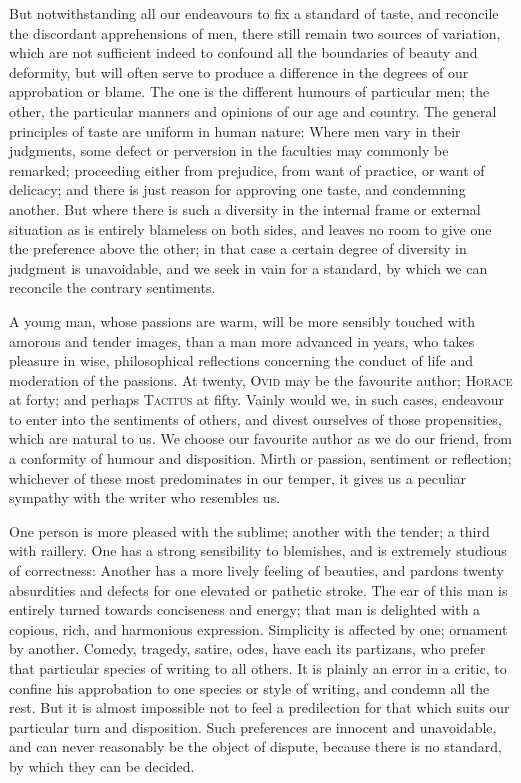 But notwithstanding all our endeavours to fix a standard of taste, and
reconcile the discordant apprehensions of men, there still remain two
sources of variation, which are not sufficient indeed to confound all
the boundaries of beauty and deformity, but will often serve to
produce a difference in the degrees of our approbation or blame. The
one is the different humours of particular men; the other, the
particular manners and opinions of our age and country. The general
principles of taste are uniform in human nature: Where men vary in
their judgments, some defect or perversion in the faculties may
commonly be remarked; proceeding either from prejudice, from want of
practice, or want of delicacy; and there is just reason for approving
one taste, and condemning another. But where there is such a diversity
in the internal frame or external situation as is entirely blameless
on both sides, and leaves no room to give one the preference above the
other; in that case a certain degree of diversity in judgment is
unavoidable, and we seek in vain  for a standard, by which
we can reconcile the contrary sentiments.

A young man, whose passions are warm, will be more sensibly touched
with amorous and tender images, than a man more advanced in years, who
takes pleasure in wise, philosophical reflections concerning the
conduct of life and moderation of the passions. At twenty,
\textsc{Ovid} may be the favourite author; \textsc{Horace} at forty;
and perhaps \textsc{Tacitus} at fifty. Vainly would we, in such cases,
endeavour to enter into the sentiments of others, and divest ourselves
of those propensities, which are natural to us. We choose our
favourite author as we do our friend, from a conformity of humour and
disposition. Mirth or passion, sentiment or reflection; whichever of
these most predominates in our temper, it gives us a peculiar
sympathy with the writer who resembles us.

One person is more pleased with the sublime; another with the tender;
a third with raillery. One has a strong sensibility to blemishes, and
is extremely studious of correctness: Another has a more lively
feeling of beauties, and pardons twenty absurdities and defects for
one elevated or pathetic stroke. The ear of this man is entirely
turned towards conciseness and energy; that man is delighted with a
copious, rich, and harmonious expression. Simplicity is affected by
one; ornament by another. Comedy, tragedy, satire, odes, have each its
partizans, who prefer that particular species of writing to all
others. It is plainly an error in a critic, to confine his approbation
to one species or style of writing, and condemn all the rest. But it
is almost impossible not to feel a predilection for that which suits
our particular turn and disposition. Such preferences are innocent and
unavoidable, and can never reasonably be the object of dispute,
because there is no standard, by which they can be decided.

